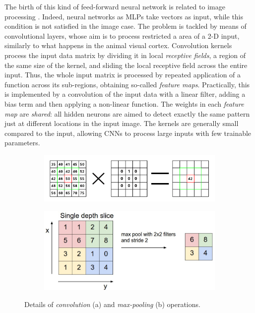 The birth of this kind of feed-forward neural network is related to image processing \cite{lawrence1997face}. Indeed, neural networks as MLPs take vectors as input, while this condition is not satisfied in the image case. The problem is tackled by means of convolutional layers, whose aim is to process restricted a area of a 2-D input, similarly to what happens in the animal visual cortex.
Convolution kernels process the input data matrix by dividing it in local \textit{receptive fields}, a region of the same size of the kernel, and sliding the local receptive field across the entire input.
Thus, the whole input matrix is processed by repeated application of a function across its sub-regions, obtaining so-called \textit{feature maps}. Practically, this is implemented by a convolution of the input data with a linear filter, adding a bias term and then applying a non-linear function.
The weights in each \textit{feature map} are \textit{shared}: all hidden neurons are aimed to detect exactly the same pattern just at different locations in the input image. The kernels are generally small compared to the input, allowing CNNs to process large inputs with few trainable parameters.

\begin{figure}[h]
	\centering
	\begin{subfigure}{0.5\columnwidth}
		\includegraphics[width=\columnwidth]{img/convolution-calculate}
		\caption{}
	\end{subfigure}
	\begin{subfigure}{0.4\columnwidth}
		\includegraphics[width=\columnwidth]{img/maxpool.jpeg}
		\caption{}
	\end{subfigure}
	\caption[Convolution and Pooling]{Details of \textit{convolution} (a) and \textit{max-pooling} (b) operations.}
	\label{fig:convolution}	
\end{figure}


